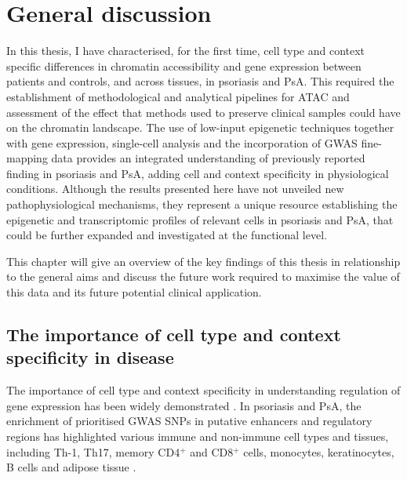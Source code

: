 \chapter{General discussion}
\label{ch:Discussion}


In this thesis, I have characterised, for the first time, cell type and context specific differences in chromatin accessibility and gene expression between patients and controls, and across tissues, in psoriasis and PsA. This required the establishment of methodological and analytical pipelines for ATAC and assessment of the effect that methods used to preserve clinical samples could have on the chromatin landscape. The use of low-input epigenetic techniques together with gene expression, single-cell analysis and the incorporation of GWAS fine-mapping data provides an integrated understanding of previously reported finding in psoriasis and PsA, adding cell and context specificity in physiological conditions. Although the results presented here have not unveiled new pathophysiological mechanisms, they represent a unique resource establishing the epigenetic and transcriptomic profiles of relevant cells in psoriasis and PsA, that could be further expanded and investigated at the functional level. 

This chapter will give an overview of the key findings of this thesis in relationship to the general aims and discuss the future work required to maximise the value of this data and its future potential clinical application.



\section{The importance of cell type and context specificity in disease}
The importance of cell type and context specificity in understanding regulation of gene expression has been widely demonstrated \parencite{Fairfax2012,Fairfax2014}. 
In psoriasis and PsA, the enrichment of prioritised GWAS SNPs in putative enhancers and regulatory regions has highlighted various immune and non-immune cell types and tissues, including Th-1, Th17, memory  CD4$^+$ and CD8$^+$ cells, monocytes, keratinocytes, B cells and adipose tissue \parencite{Farh2015,Tsoi2017,Bowes2015,Ellinghaus2016,Lin2018}.

